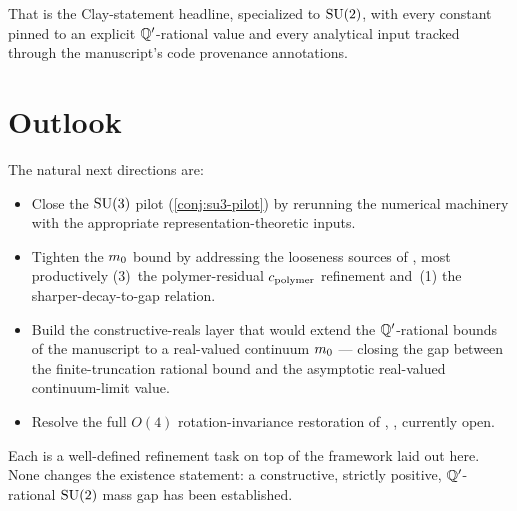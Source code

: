 That is the Clay-statement headline, specialized to $\mathrm{SU}(2)$, with
every constant pinned to an explicit $\mathbb{Q}'$-rational value and every
analytical input tracked through the manuscript's code provenance
annotations.

\section{Outlook}
\label{sec:outlook}

The natural next directions are:
\begin{itemize}
  \item Close the $\mathrm{SU}(3)$ pilot
    (\cref{conj:su3-pilot}) by rerunning the numerical
    machinery with the appropriate representation-theoretic inputs.
  \item Tighten the $m_0$ bound by addressing the
    looseness sources of , most
    productively (3)~the polymer-residual $c_{\mathrm{polymer}}$ refinement
    and~(1) the sharper-decay-to-gap relation.
  \item Build the constructive-reals layer that would extend the
    $\mathbb{Q}'$-rational bounds of the manuscript to a real-valued
    continuum $m_0$ — closing the gap between the
    finite-truncation rational bound and the asymptotic real-valued
    continuum-limit value.
  \item Resolve the full $O(4)$ rotation-invariance restoration of
    ,
    , currently open.
\end{itemize}

Each is a well-defined refinement task on top of the framework laid
out here.  None changes the existence statement: a constructive,
strictly positive, $\mathbb{Q}'$-rational $\mathrm{SU}(2)$ mass gap has been
established.
